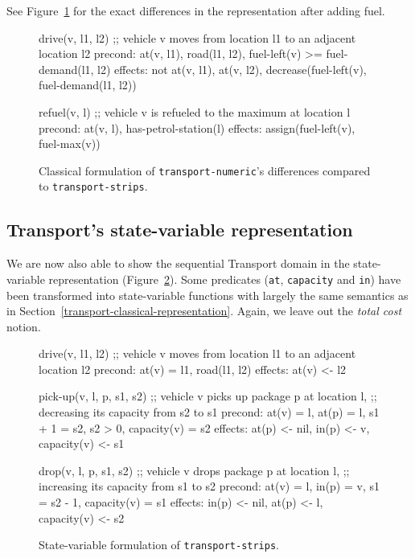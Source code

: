 See Figure~\ref{code:classical-numeric} for the exact differences
in the representation after adding fuel.

\begin{figure}[tbp]
\begin{code}
drive(v, l1, l2)
  ;; vehicle v moves from location l1 to an adjacent location l2
  precond: at(v, l1), road(l1, l2), fuel-left(v) >= fuel-demand(l1, l2)
  effects: not at(v, l1), at(v, l2),
           decrease(fuel-left(v),  fuel-demand(l1, l2))
  
refuel(v, l)
  ;; vehicle v is refueled to the maximum at location l
  precond: at(v, l), has-petrol-station(l)
  effects: assign(fuel-left(v), fuel-max(v))
\end{code}
\caption{Classical formulation of \texttt{transport-numeric}'s differences compared to \texttt{transport-strips}.}
\label{code:classical-numeric}
\end{figure}

\subsection{Transport's state-variable representation}

We are now also able to show the sequential Transport domain
in the state-variable representation (Figure~\ref{code:statevar-strips}).
Some predicates (\verb+at+, \verb+capacity+ and \verb+in+) have been transformed
into state-variable functions with largely the same semantics as in
Section~\ref{transport-classical-representation}. Again, we leave out
the \textit{total cost} notion.

\begin{figure}[tbp]
\begin{code}
drive(v, l1, l2)
  ;; vehicle v moves from location l1 to an adjacent location l2
  precond: at(v) = l1, road(l1, l2)
  effects: at(v) <- l2

pick-up(v, l, p, s1, s2)
  ;; vehicle v picks up package p at location l,
  ;; decreasing its capacity from s2 to s1
  precond: at(v) = l, at(p) = l, s1 + 1 = s2, s2 > 0, capacity(v) = s2
  effects: at(p) <- nil, in(p) <- v, capacity(v) <- s1
  
drop(v, l, p, s1, s2)
  ;; vehicle v drops package p at location l,
  ;; increasing its capacity from s1 to s2
  precond: at(v) = l, in(p) = v, s1 = s2 - 1, capacity(v) = s1
  effects: in(p) <- nil, at(p) <- l, capacity(v) <- s2
\end{code}
\caption{State-variable formulation of \texttt{transport-strips}.}
\label{code:statevar-strips}
\end{figure}

